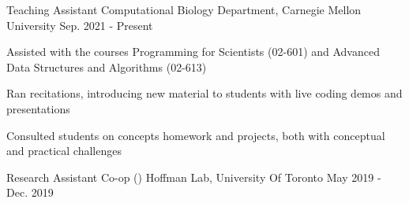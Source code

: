 \begin{cventries}
\cventry
{Teaching Assistant}
{Computational Biology Department, Carnegie Mellon University}
{Sep. 2021 - Present}
{}
{
\begin{cvitems}
    \item {Assisted with the courses Programming for Scientists (02-601) and Advanced Data Structures and Algorithms (02-613)}
    \item {Ran recitations, introducing new material to students with live coding demos and presentations}
    \item {Consulted students on concepts homework and projects, both with conceptual and practical challenges}
\end{cvitems}
}
\cventry
{Research Assistant Co-op ()}
{Hoffman Lab, University Of Toronto}
{May 2019 - Dec. 2019}
{}
{
\begin{cvitems}

\end{cvitems}}
\end{cventries}
